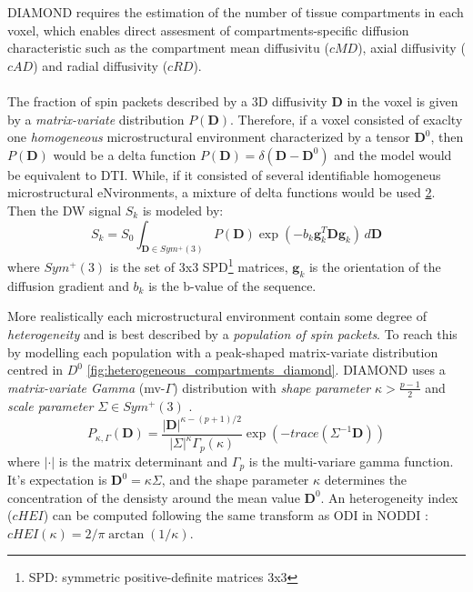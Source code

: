  \begin{figure}[h]
   \centering
   \caption{}
   \label{fig:multicompartment}
 \end{figure}

 DIAMOND requires the estimation of the number of tissue compartments in each voxel, which enables direct assesment of compartments-specific diffusion characteristic such as the compartment mean diffusivitu ($cMD$), axial diffusivity ($cAD$) and radial diffusivity ($cRD$). 
 \\\\
 The fraction of spin packets described by a 3D diffusivity $\mathbf{D}$ in the voxel is given by a \emph{matrix-variate} distribution $P(\mathbf{D})$. Therefore, if a voxel consisted of exaclty one \emph{homogeneous} microstructural environment characterized by a tensor $\mathbf{D}^0$, then $P(\mathbf{D})$ would be a delta function $P(\mathbf{D})=\delta(\mathbf{D}-\mathbf{D}^0)$ and the model would be equivalent to DTI. While, if it consisted of several identifiable homogeneus microstructural eNvironments, a mixture of delta functions would be used \cite{scherrer2016diamond} \ref{fig:homogeneous_compartments_diamond}. Then the DW signal $S_k$ is modeled by:
 \begin{equation}\label{eq:1.26}
   S_k = S_0 \int_{\mathbf{D}\in Sym^{+}(3)} P(\mathbf{D})\exp(-b_k\mathbf{g}_k^T\mathbf{D}\mathbf{g}_k) \,d\mathbf{D}
 \end{equation}
 where $Sym^{+}(3)$ is the set of 3x3 SPD\footnote{SPD: symmetric positive-definite matrices 3x3} matrices, $\mathbf{g}_k$ is the orientation of the diffusion gradient and $b_k$ is the b-value of the sequence.

 \begin{figure}[h]
   \centering
   \caption{}
   \label{fig:homogeneous_compartments_diamond}
 \end{figure}

 More realistically each microstructural environment contain some degree of \emph{heterogeneity} and is best described by a \emph{population of spin packets}. To reach this by modelling each population with a peak-shaped matrix-variate distribution centred in $D^0$ \ref{fig:heterogeneous_compartments_diamond}. DIAMOND uses a \emph{matrix-variate Gamma} (mv-$\Gamma$) distribution with \emph{shape parameter} $\kappa > \frac{p-1}{2}$ and \emph{scale parameter} $\Sigma \in Sym^{+}(3)$ \cite{scherrer2016diamond}.
 \begin{equation}
   P_{\kappa,\Gamma}(\mathbf{D}) = \frac{|\mathbf{D}|^{\kappa-(p+1)/2}}{|\Sigma|^\kappa \Gamma_p(\kappa)}\exp (-trace(\Sigma^{-1}\mathbf{D}))
 \end{equation}
 where $|\cdot|$ is the matrix determinant and $\Gamma_p$ is the multi-variare gamma function. It's expectation is $\mathbf{D}^0=\kappa\Sigma$, and the shape parameter $\kappa$ determines the concentration of the densisty around the mean value $\mathbf{D}^0$. An heterogeneity index ($cHEI$) can be computed following the same transform as ODI in NODDI \cite{zhang2012noddi}: $cHEI(\kappa) = 2/\pi \arctan (1/\kappa)$.

